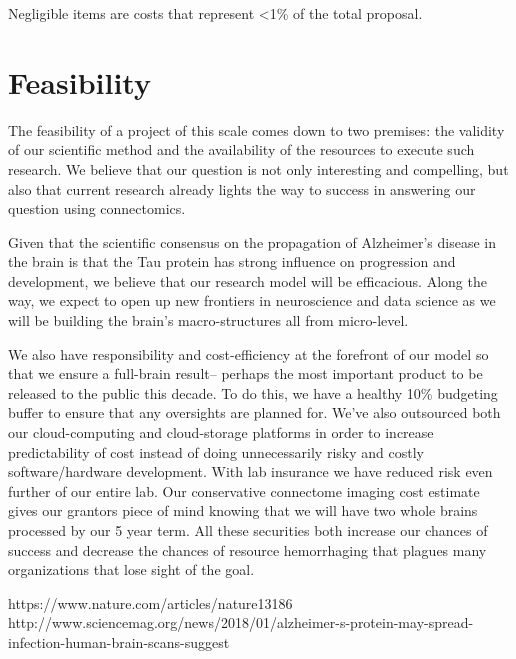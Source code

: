 \documentclass[11pt]{article}
\begin{document}
Negligible items are costs that represent \textless1\% of the total proposal. 

\section{Feasibility} 

The feasibility of a project of this scale comes down to two premises: the validity of our scientific method and the availability of the resources to execute such research. We believe that our question is not only interesting and compelling, but also that current research already lights the way to success in answering our question using connectomics. 

Given that the scientific consensus on the propagation of Alzheimer's disease in the brain is that the Tau protein has strong influence on progression and development, we believe that our research model will be efficacious. Along the way, we expect to open up new frontiers in neuroscience and data science as we will be building the brain's macro-structures all from micro-level. 

We also have responsibility and cost-efficiency at the forefront of our model so that we ensure a full-brain result-- perhaps the most important product to be released to the public this decade. To do this, we have a healthy 10\% budgeting buffer to ensure that any oversights are planned for. We've also outsourced both our cloud-computing and cloud-storage platforms in order to increase predictability of cost instead of doing unnecessarily risky and costly software/hardware development. With lab insurance we have reduced risk even further of our entire lab. Our conservative connectome imaging cost estimate gives our grantors piece of mind knowing that we will have two whole brains processed by our 5 year term. All these securities both increase our chances of success and decrease the chances of resource hemorrhaging that plagues many organizations that lose sight of the goal.

\begin{thebibliography}{2}

https://www.nature.com/articles/nature13186
http://www.sciencemag.org/news/2018/01/alzheimer-s-protein-may-spread-infection-human-brain-scans-suggest

\end{thebibliography}
\end{document}
